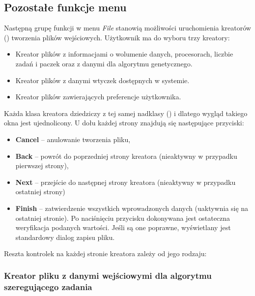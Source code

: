 \subsection{Pozostałe funkcje menu}

Następną grupę funkcji w menu \emph{File} stanowią możliwości uruchomienia kreatorów () tworzenia plików wejściowych. Użytkownik ma do wyboru trzy 
kreatory: 
\begin{itemize}
	\item Kreator plików z informacjami o wolumenie danych, procesorach, liczbie zadań i paczek oraz z danymi dla algorytmu genetycznego.
	\item Kreator plików z danymi wtyczek dostępnych w systemie.
	\item Kreator plików zawierających preferencje użytkownika.
\end{itemize}

Każda klasa kreatora dziedziczy z tej samej nadklasy () i dlatego wygląd takiego okna jest ujednolicony. U dołu każdej strony 
znajdują się następujące przyciski:
\begin{itemize}
	\item \textbf{Cancel} -- anulowanie tworzenia pliku,
	\item \textbf{Back} -- powrót do poprzedniej strony kreatora (nieaktywny w przypadku pierwszej strony),
	\item \textbf{Next} -- przejście do następnej strony kreatora (nieaktywny w przypadku ostatniej strony)
	\item \textbf{Finish} -- zatwierdzenie wszystkich wprowadzonych danych (uaktywnia się na ostatniej stronie). Po naciśnięciu przycisku dokonywana 
	jest ostateczna weryfikacja podanych wartości. Jeśli są one poprawne, wyświetlany jest standardowy dialog zapisu pliku.
\end{itemize}

Reszta kontrolek na każdej stronie kreatora zależy od jego rodzaju:

\subsubsection*{Kreator pliku z danymi wejściowymi dla algorytmu szeregującego zadania}

